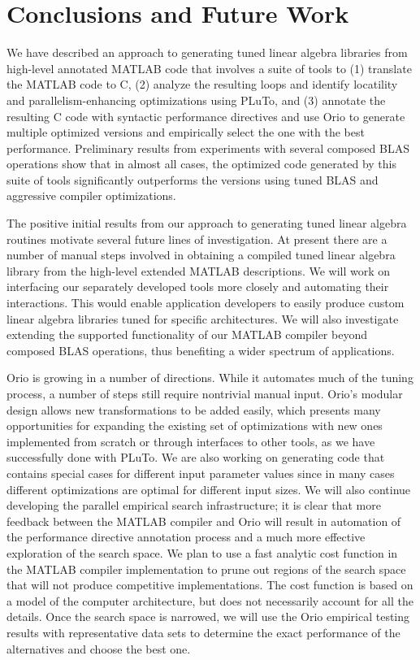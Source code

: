 \documentclass[11pt]{article}
\begin{document}
\section{Conclusions and Future Work}

We have described an approach to generating tuned linear algebra libraries from high-level annotated MATLAB code that involves a suite of tools to (1) translate the MATLAB code to C, (2) analyze the resulting loops and identify locatility and parallelism-enhancing optimizations using PLuTo, and (3) annotate the resulting C code with syntactic performance directives and use Orio to generate multiple optimized versions and empirically select the one with the best performance. Preliminary results from experiments with several composed BLAS operations show that in almost all cases, the optimized code generated by this suite of tools significantly outperforms the versions using tuned BLAS and aggressive compiler optimizations.

The positive initial results from our approach to generating tuned linear algebra routines motivate several future lines of investigation. At present there are a number of manual steps involved in obtaining a compiled tuned linear algebra library from the high-level extended MATLAB descriptions. We will work on interfacing our separately developed tools more closely and automating their interactions. This would enable application developers to easily produce custom linear algebra libraries tuned for specific architectures. We will also investigate extending the supported functionality of our MATLAB compiler beyond composed BLAS operations, thus benefiting a wider spectrum of applications.

Orio is growing in a number of directions. While it automates much of the tuning process, a number of steps still require nontrivial manual input. Orio's modular design allows new transformations to be added easily, which presents many opportunities for expanding the existing set of optimizations with new ones implemented from scratch or through interfaces to other tools, as we have successfully done with PLuTo. We are also working on generating code that contains special cases for different input parameter values since in many cases different optimizations are optimal for different input sizes.  We will also continue developing the parallel empirical search infrastructure; it is clear that more feedback between the MATLAB compiler and Orio will result in automation of the performance directive annotation process and a much more effective exploration of the search space. We plan to use a fast analytic cost function in the MATLAB compiler implementation to prune out regions of the search space that will not produce competitive implementations. The cost function is based on a model of the computer architecture, but does not necessarily account for all the details. Once the search space is narrowed, we will use the Orio empirical testing results with representative data sets to determine the exact performance of the alternatives and choose the best one.
\end{document}
